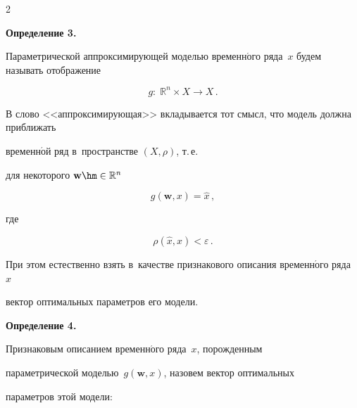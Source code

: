 \begin{multicols}{2}
\noindent


\textbf{Определение 3.}\


Параметрической аппроксими\-ру\-ющей моделью временн$\acute{\mbox{о}}$го ряда~$x$ будем называть отображение


\begin{equation}


\label{eq:regression}


g:\;\mathbb{R}^n\times X\to X\,.


\end{equation}





\smallskip





В слово <<аппроксимирующая>> вкладывается тот смысл, что модель должна приближать 


временн$\acute{\mbox{о}}$й ряд в~пространстве $(X,\rho)$, т.\,е.\ 


для некоторого $\mathbf{w}\hm\in \mathbb{R}^n$


$$


g(\mathbf{w},x)=\hat{x}\,,


$$


где


$$


\rho(\hat{x},x)<\varepsilon\,.


$$


При этом естественно взять в~качестве признакового описания временн$\acute{\mbox{о}}$го ряда~$x$


 вектор оптимальных параметров его модели.





\smallskip







\noindent


\textbf{Определение 4.}\


Признаковым описанием вре\-мен\-н$\acute{\mbox{о}}$го ряда~$x$, порожденным 


параметрической моделью~$g(\mathbf{w},x)$, назовем вектор оптимальных 


па\-ра\-мет\-ров этой модели:


\begin{equation}


\label{eq:feature_solution}



\end{equation}
\end{multicols}
